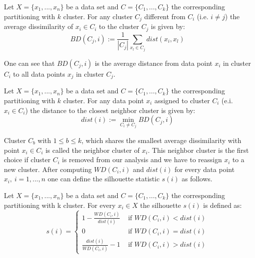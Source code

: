 \begin{definition}
	Let $X=\{x_1, ..., x_n\}$ be a data set and $C=\{C_1, ..., C_k\}$ the corresponding partitioning with $k$ cluster. For any cluster $C_{j}$ different from $C_i$ (i.e. $i \neq j$) the average dissimilarity of  $x_i \in C_{i}$ to the cluster $C_{j}$ is given by: 
	\begin{equation*}\label{equ:dist_C}
		BD(C_j,i) := \frac{1}{|C_j|}\sum_{x_l \in C_j} dist(x_i, x_l) 
	\end{equation*}
\end{definition}

One can see that $BD(C_j,i)$ is the average distance from data point $x_i$ in cluster $C_i$ to all data points $x_j$ in cluster $C_j$. 

\begin{definition}
	Let $X=\{x_1, ..., x_n\}$ be a data set and $C=\{C_1, ..., C_k\}$ the corresponding partitioning with $k$ cluster. For any data point $x_i$ assigned to cluster $C_i$ (e.i. $x_i \in C_i$) the distance to the closest neighbor cluster is given by: 
	\begin{equation*}\label{equ:dist_B}
		dist(i) := \min_{C_i\neq C_j} BD(C_j,i)
	\end{equation*}
\end{definition}

Cluster $C_b$ with $1 \leq b \leq k$, which shares the smallest average dissimilarity with point $x_i \in C_i$ is called the neighbor cluster of $x_i$. This neighbor cluster is the first choice if cluster $C_i$ is removed from our analysis and we have to reassign $x_i$ to a new cluster. After computing $WD(C_i,i)$ and $dist(i)$ for every data point $x_i,~i=1,...,n$ one can define the silhouette statistic $s(i)$ as follows.

\begin{definition}
Let $X=\{x_1, ..., x_n\}$ be a data set and $C=\{C_1, ..., C_k\}$ the corresponding partitioning with k cluster. For every $x_i \in X$ the silhouette $s(i)$ is defined as:
	\begin{equation*}\label{equ:silhouette_long}
	s(i) = \begin{cases}
		1-\frac{WD(C_i,i)}{dist(i)} 	& \text{ if } WD(C_i,i) < dist(i)\\
		0 								& \text{ if } WD(C_i,i) = dist(i)\\
		\frac{dist(i)}{WD(C_i,i)}-1 	& \text{ if } WD(C_i,i) > dist(i)
	\end{cases}
	\end{equation*}
\end{definition}

